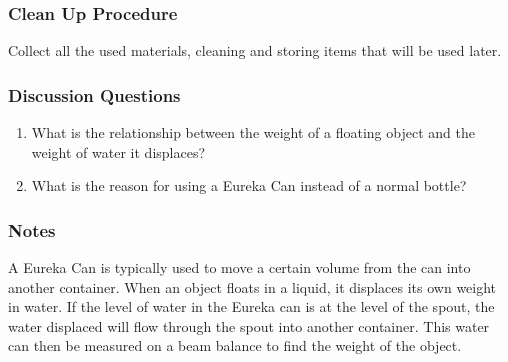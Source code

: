 \subsubsection*{Clean Up Procedure}
Collect all the used materials, cleaning and storing items that will be used later.

\subsubsection*{Discussion Questions}
\begin{enumerate}
\item{What is the relationship between the weight of a floating object and the weight of water it displaces?}
\item{What is the reason for using a Eureka Can instead of a normal bottle?}
\end{enumerate}

\subsubsection*{Notes}
A Eureka Can is typically used to move a certain volume from the can into another container.  When an object floats in a liquid, it displaces its own weight in water.  If the level of water in the Eureka can is at the level of the spout, the water displaced will flow through the spout into another container.  This water can then be measured on a beam balance to find the weight of the object.



